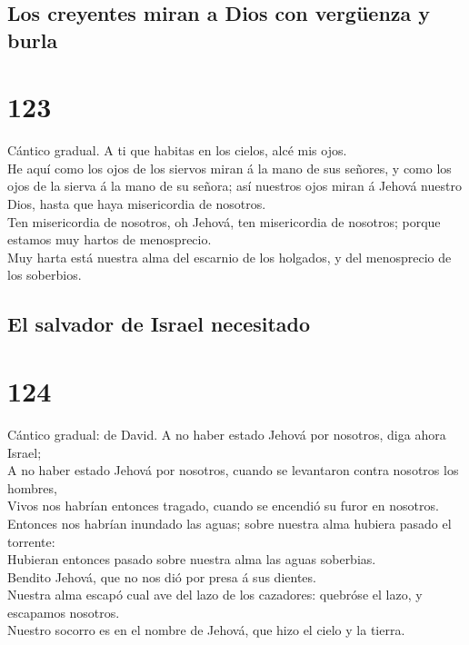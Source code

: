 \hypertarget{los-creyentes-miran-a-dios-con-verguxfcenza-y-burla}{%
\subsection{Los creyentes miran a Dios con vergüenza y
burla}\label{los-creyentes-miran-a-dios-con-verguxfcenza-y-burla}}

\hypertarget{section-122}{%
\section{123}\label{section-122}}

 Cántico gradual. A ti que habitas en los cielos, alcé mis
ojos.\\
 He aquí como los ojos de los siervos miran á la mano de
sus señores, y como los ojos de la sierva á la mano de su señora; así
nuestros ojos miran á Jehová nuestro Dios, hasta que haya misericordia
de nosotros.\\
 Ten misericordia de nosotros, oh Jehová, ten misericordia
de nosotros; porque estamos muy hartos de menosprecio.\\
 Muy harta está nuestra alma del escarnio de los holgados,
y del menosprecio de los soberbios.

\hypertarget{el-salvador-de-israel-necesitado}{%
\subsection{El salvador de Israel
necesitado}\label{el-salvador-de-israel-necesitado}}

\hypertarget{section-123}{%
\section{124}\label{section-123}}

 Cántico gradual: de David. A no haber estado Jehová por
nosotros, diga ahora Israel;\\
 A no haber estado Jehová por nosotros, cuando se
levantaron contra nosotros los hombres,\\
 Vivos nos habrían entonces tragado, cuando se encendió su
furor en nosotros.\\
 Entonces nos habrían inundado las aguas; sobre nuestra
alma hubiera pasado el torrente:\\
 Hubieran entonces pasado sobre nuestra alma las aguas
soberbias.\\
 Bendito Jehová, que no nos dió por presa á sus dientes.\\
 Nuestra alma escapó cual ave del lazo de los cazadores:
quebróse el lazo, y escapamos nosotros.\\
 Nuestro socorro es en el nombre de Jehová, que hizo el
cielo y la tierra.

